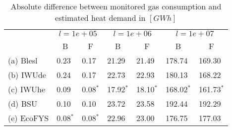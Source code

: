 \begin{table}[htb]
\centering
\caption{Absolute difference between monitored gas consumption and estimated
    heat demand in $[GWh]$ }
\label{tab:diffAbs}
\begin{tabular}{l ll ll ll}
\toprule
 & \multicolumn{2}{c}{$l = 1e+05$} 
 & \multicolumn{2}{c}{$l = 1e+06$}
 & \multicolumn{2}{c}{$l = 1e+07$}
   \\
& \multicolumn{1}{c}{B} & \multicolumn{1}{c}{F} & 
  \multicolumn{1}{c}{B} & \multicolumn{1}{c}{F} & 
  \multicolumn{1}{c}{B} & \multicolumn{1}{c}{F} \\
\midrule

(a) Blesl  &  0.23 &  0.17 &  21.29 &  21.49 &  178.74 &  169.30 \\
(b) IWUde  &  0.24 &  0.17 &  22.73 &  22.93 &  180.13 &  168.22 \\
(c) IWUhe  &  0.09 &0.08$^*$ &17.92$^*$ &18.10$^*$ &168.02$^*$ &161.73$^*$ \\
(d) BSU    &  0.10 &  0.10 &  23.72 &  23.58 &  192.44 &  192.29 \\
(e) EcoFYS &  0.08$^*$ &  0.08$^*$ &  22.96 &  23.00 &  176.75 &  177.03 \\

\bottomrule
\end{tabular}
\end{table}

